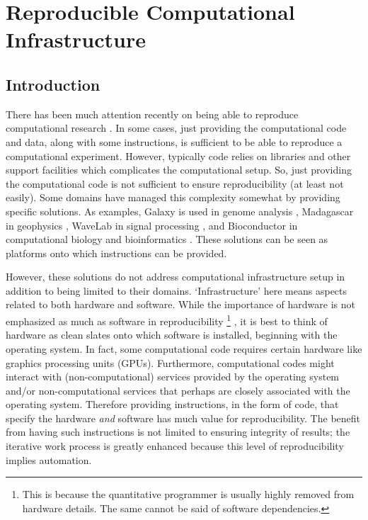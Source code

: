 \chapter{Reproducible Computational Infrastructure}
\label{ch:pcc}

\section{Introduction}


There has been much attention recently on being able to reproduce computational research \cite{Stodden2013}. 
%
In some cases, just providing the computational code and data, along with some instructions, is sufficient to be able to reproduce a computational experiment.
%
However, typically code relies on libraries and other support facilities which complicates the computational setup.
%
So, just providing the computational code is not sufficient to ensure reproducibility (at least not easily).
%
Some domains have managed this complexity somewhat by providing specific solutions.
%
As examples, \textsf{Galaxy} is used in genome analysis \cite{Giardine2005},
%
\textsf{Madagascar} in geophysics \cite{Fomel2013},
%
\textsf{WaveLab} in signal processing \cite{Buckheit1995},
%
and \textsf{Bioconductor} in computational biology and bioinformatics \cite{Gentleman2004}.
%
These solutions can be seen as platforms onto which instructions can be provided.


However, these solutions do not address computational infrastructure setup in addition to being limited to their domains.
%
`Infrastructure' here means aspects related to both hardware and software.
%
While the importance of hardware is not emphasized as much as software in reproducibility%
\footnote{This is because the quantitative programmer is usually highly removed from hardware details. The same cannot be said of software dependencies.}%
,
it is best to think of hardware as clean slates onto which software is installed, beginning with the operating system.
%
In fact, some computational code requires certain hardware like graphics processing units (GPUs).
%
Furthermore, computational codes might interact with (non-computational) services provided by the operating system and/or non-computational services that perhaps are closely associated with the operating system.
%
Therefore providing instructions, in the form of code, that specify the hardware \emph{and} software has much value for reproducibility.
%
The benefit from having such instructions is not limited to ensuring integrity of results;
%
the iterative work process is greatly enhanced because this level of reproducibility implies automation.


